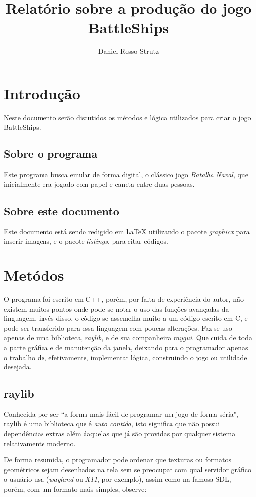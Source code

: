 \documentclass {article}
\author{Daniel Rosso Strutz}
\title{Relatório sobre a produção do jogo BattleShips}
\begin{document}
\maketitle

\section{Introdução}
Neste documento serão discutidos os métodos e lógica utilizados para criar o jogo BattleShips.
 
\subsection{Sobre o programa}
Este programa busca emular de forma digital, o clássico jogo \textit{Batalha Naval}, que inicialmente era jogado com papel e caneta entre duas pessoas.
\subsection{Sobre este documento}
Este documento está sendo redigido em {\LaTeX} utilizando o pacote \textit{graphicx} para inserir imagens, e o pacote \textit{listings}, para citar códigos.
\section{Metódos}
O programa foi escrito em C++, porém, por falta de experiência do autor, não existem muitos pontos onde pode-se notar o uso das funções avançadas da
linguagem, invés disso, o código se assemelha muito a um código escrito em C, e pode ser transferido para essa linguagem com poucas alterações.  Faz-se uso apenas de uma biblioteca, \textit{raylib}, e de sua companheira \textit{raygui}.  Que cuida de toda a parte gráfica e de manutenção da janela, deixando para o programador apenas o trabalho de, efetivamente, implementar lógica, construindo o jogo ou utilidade desejada.
\subsection{raylib}
Conhecida por ser ``a forma mais fácil de programar um jogo de forma séria", raylib é uma biblioteca que é \emph{auto contida}, isto significa que não possui dependências extras além daquelas que já são providas por qualquer sistema relativamente moderno.

De forma resumida, o programador pode ordenar que texturas ou formatos geométricos sejam desenhados na tela sem se preocupar com qual servidor gráfico o usuário usa (\textit{wayland} ou \textit{X11}, por exemplo), assim como na famosa SDL, porém, com um formato mais simples, observe:
\end{document}
